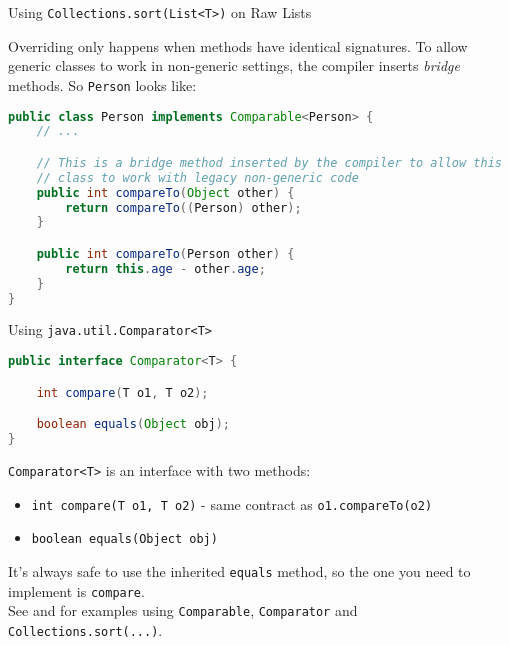 \documentclass{beamer}
\begin{document}
\begin{frame}[fragile]{Using {\tt Collections.sort(List<T>)} on Raw Lists}

Overriding only happens when methods have identical signatures.  To allow generic classes to work in non-generic settings, the compiler inserts {\it bridge} methods.  So {\tt Person} looks like:

\begin{lstlisting}[language=Java]
public class Person implements Comparable<Person> {
    // ...

    // This is a bridge method inserted by the compiler to allow this
    // class to work with legacy non-generic code
    public int compareTo(Object other) {
        return compareTo((Person) other);
    }

    public int compareTo(Person other) {
        return this.age - other.age;
    }
}
\end{lstlisting}

\end{frame}


\begin{frame}[fragile]{Using {\tt java.util.Comparator<T>}}


\begin{lstlisting}[language=Java]
public interface Comparator<T> {

    int compare(T o1, T o2);

    boolean equals(Object obj);
}
\end{lstlisting}

{\tt Comparator<T>} is an interface with two methods:
\begin{itemize}
\item {\tt int compare(T o1, T o2)} -  same contract as {\tt o1.compareTo(o2)}
\item {\tt boolean equals(Object obj)}
\end{itemize}
It's always safe to use the inherited {\tt equals} method, so the one you need to implement is {\tt compare}.\\

See  and  for examples using {\tt Comparable}, {\tt Comparator} and {\tt Collections.sort(...)}.

\end{frame}
\end{document}

